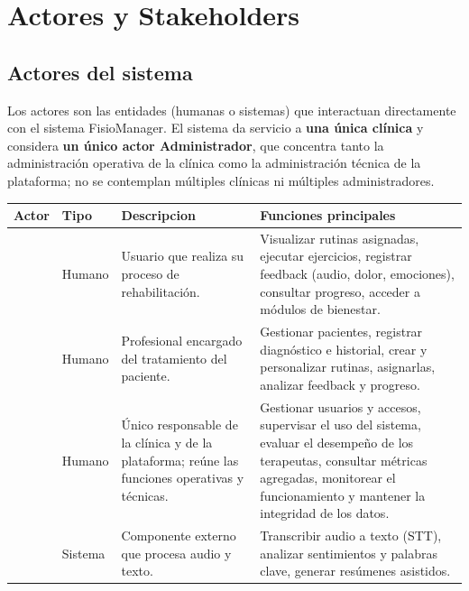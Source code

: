
\chapter{Actores y Stakeholders}

\section{Actores del sistema}

Los actores son las entidades (humanas o sistemas) que interactuan directamente con el sistema FisioManager. El sistema da servicio a \textbf{una única clínica} y considera \textbf{un único actor Administrador}, que concentra tanto la administración operativa de la clínica como la administración técnica de la plataforma; no se contemplan múltiples clínicas ni múltiples administradores.

\begin{longtable}{L{2.8cm} L{1.6cm} L{4cm} L{6.5cm}}
  \toprule
  \textbf{\color{fmAccent}Actor} &
  \textbf{\color{fmAccent}Tipo} &
  \textbf{\color{fmAccent}Descripcion} &
  \textbf{\color{fmAccent}Funciones principales} \\
  \midrule
  \endhead

   & Humano &
  Usuario que realiza su proceso de rehabilitación. &
  Visualizar rutinas asignadas, ejecutar ejercicios, registrar feedback (audio, dolor, emociones), consultar progreso, acceder a módulos de bienestar. \\

   & Humano &
  Profesional encargado del tratamiento del paciente. &
  Gestionar pacientes, registrar diagnóstico e historial, crear y personalizar rutinas, asignarlas, analizar feedback y progreso. \\

   & Humano &
  Único responsable de la clínica y de la plataforma; reúne las funciones operativas y técnicas. &
  Gestionar usuarios y accesos, supervisar el uso del sistema, evaluar el desempeño de los terapeutas, consultar métricas agregadas, monitorear el funcionamiento y mantener la integridad de los datos. \\

   & Sistema &
  Componente externo que procesa audio y texto. &
  Transcribir audio a texto (STT), analizar sentimientos y palabras clave, generar resúmenes asistidos. \\

  \bottomrule
\end{longtable}

